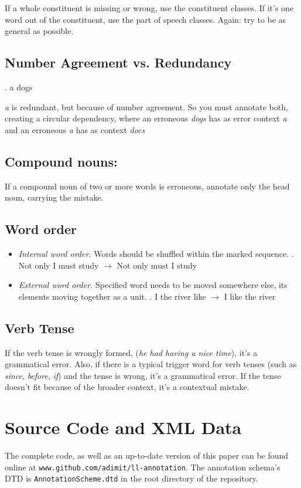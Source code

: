 \documentclass[12pt]{article}
\begin{document}
If a whole constituent is missing or wrong, use the constituent classes. If it's
one word out of the constituent, use the part of speech classes. Again: try to
be as general as possible.

\subsection{Number Agreement vs. Redundancy}

\ex. a dogs

\textit{a} is redundant, but because of number agreement. So you must annotate both,
creating a circular dependency, where an erroneous \textit{dogs} has as error
context \textit{a} and an erroneous \textit{a} has as context \textit{docs}

\subsection{Compound nouns:}

If a compound noun of two or more words is erroneous, annotate only the head noun, carrying the mistake.


\subsection{Word order}
\begin{itemize}
\item \textit{Internal word order.} Words should be shuffled within the marked sequence. 
\ex. Not only I must study $\to$ Not only must I study

\item \textit{External word order.} Specified word needs to be moved somewhere
else, its elements moving together as a unit.
\ex. I the river like $\to$ I like the river

\end{itemize}

\subsection{Verb Tense}

If the verb tense is wrongly formed, (\textit{he had having a nice time}), it's
a grammatical error. Also, if there is a typical trigger word for verb tenses
(such as \textit{since}, \textit{before}, \textit{if}) and the tense is wrong,
it's a grammatical error. If the tense doesn't fit because of the broader
context, it's a contextual mistake.

\section{Source Code and XML Data}\label{sec:github}

The complete code, as well as an up-to-date version of this paper can be found
online at \texttt{www.github.com/adimit/ll-annotation}. The annotation schema's
DTD is \texttt{AnnotationScheme.dtd} in the root directory of the repository.
\end{document}
